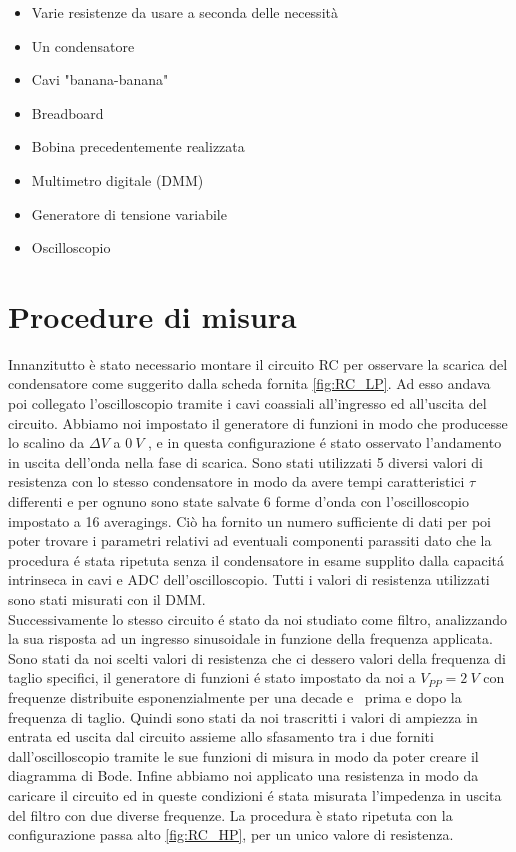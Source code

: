 \documentclass{article}
\begin{document}
\begin{itemize}
  \item Varie resistenze da usare a seconda delle necessità
  \item Un condensatore
  \item Cavi "banana-banana"
  \item Breadboard
  \item Bobina precedentemente realizzata
  \item Multimetro digitale (DMM)
  \item Generatore di tensione variabile
  \item Oscilloscopio
\end{itemize}

\newpage

\section{Procedure di misura}

Innanzitutto è stato necessario montare il circuito RC per osservare la scarica del condensatore come suggerito dalla scheda fornita \ref{fig:RC_LP}. Ad esso andava poi collegato l'oscilloscopio tramite i cavi coassiali all'ingresso ed all'uscita del circuito. Abbiamo noi impostato il generatore di funzioni in modo che  producesse lo scalino da $\Delta V$ a $0\ V$ , e in questa configurazione \'e stato osservato l'andamento in uscita dell'onda nella fase di scarica. Sono stati utilizzati 5 diversi valori di resistenza con lo stesso condensatore in modo da avere tempi caratteristici $\tau$ differenti e per ognuno sono state salvate 6 forme d'onda con l'oscilloscopio impostato a 16 averagings. Ciò ha fornito un numero sufficiente di dati per poi poter trovare i parametri relativi ad eventuali componenti parassiti dato che la procedura \'e stata ripetuta senza il condensatore in esame supplito dalla capacit\'a intrinseca in cavi e ADC dell'oscilloscopio. Tutti i valori di resistenza utilizzati sono stati misurati con il DMM. \\

Successivamente lo stesso circuito \'e stato da noi studiato come filtro, analizzando la sua risposta ad un ingresso sinusoidale in funzione della frequenza applicata. Sono stati da noi scelti valori di resistenza che ci dessero valori della frequenza di taglio specifici, il generatore di funzioni \'e stato impostato da noi a $V_{PP} = 2 \ V$ %
con frequenze distribuite esponenzialmente per una decade e \textonehalf \ prima e dopo la frequenza di taglio. Quindi sono stati da noi trascritti i valori di ampiezza in entrata ed uscita dal circuito assieme allo sfasamento tra i due forniti dall'oscilloscopio tramite le sue funzioni di misura in modo da poter creare il diagramma di Bode. Infine abbiamo noi applicato una resistenza in modo da caricare il circuito ed in queste condizioni \'e stata misurata l'impedenza in uscita del filtro con due diverse frequenze. La procedura è stato ripetuta con la configurazione passa alto \ref{fig:RC_HP}, per un unico valore di resistenza. \\
\end{document}
